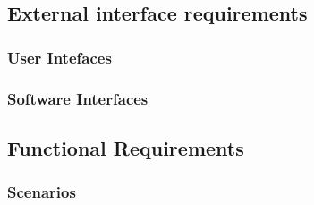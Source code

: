 \subsection{External    interface    requirements} 
	\subsubsection{User Intefaces}
	\subsubsection{Software Interfaces}
\subsection{Functional Requirements}
	\subsubsection{Scenarios}
